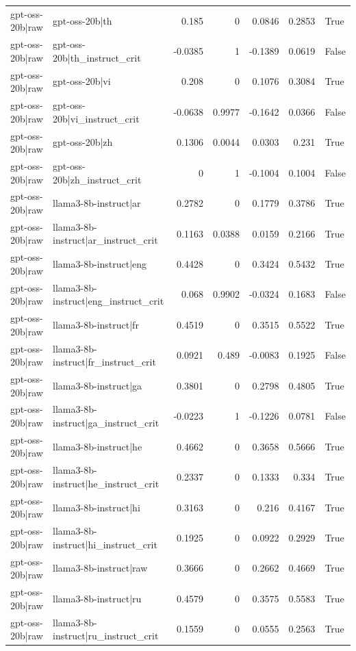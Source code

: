 \begin{table}
\begin{tabular}{l l r r r r l}
gpt-oss-20b|raw & gpt-oss-20b|th & 0.185 & 0 & 0.0846 & 0.2853 & True \\
gpt-oss-20b|raw & gpt-oss-20b|th_instruct_crit & -0.0385 & 1 & -0.1389 & 0.0619 & False \\
gpt-oss-20b|raw & gpt-oss-20b|vi & 0.208 & 0 & 0.1076 & 0.3084 & True \\
gpt-oss-20b|raw & gpt-oss-20b|vi_instruct_crit & -0.0638 & 0.9977 & -0.1642 & 0.0366 & False \\
gpt-oss-20b|raw & gpt-oss-20b|zh & 0.1306 & 0.0044 & 0.0303 & 0.231 & True \\
gpt-oss-20b|raw & gpt-oss-20b|zh_instruct_crit & 0 & 1 & -0.1004 & 0.1004 & False \\
gpt-oss-20b|raw & llama3-8b-instruct|ar & 0.2782 & 0 & 0.1779 & 0.3786 & True \\
gpt-oss-20b|raw & llama3-8b-instruct|ar_instruct_crit & 0.1163 & 0.0388 & 0.0159 & 0.2166 & True \\
gpt-oss-20b|raw & llama3-8b-instruct|eng & 0.4428 & 0 & 0.3424 & 0.5432 & True \\
gpt-oss-20b|raw & llama3-8b-instruct|eng_instruct_crit & 0.068 & 0.9902 & -0.0324 & 0.1683 & False \\
gpt-oss-20b|raw & llama3-8b-instruct|fr & 0.4519 & 0 & 0.3515 & 0.5522 & True \\
gpt-oss-20b|raw & llama3-8b-instruct|fr_instruct_crit & 0.0921 & 0.489 & -0.0083 & 0.1925 & False \\
gpt-oss-20b|raw & llama3-8b-instruct|ga & 0.3801 & 0 & 0.2798 & 0.4805 & True \\
gpt-oss-20b|raw & llama3-8b-instruct|ga_instruct_crit & -0.0223 & 1 & -0.1226 & 0.0781 & False \\
gpt-oss-20b|raw & llama3-8b-instruct|he & 0.4662 & 0 & 0.3658 & 0.5666 & True \\
gpt-oss-20b|raw & llama3-8b-instruct|he_instruct_crit & 0.2337 & 0 & 0.1333 & 0.334 & True \\
gpt-oss-20b|raw & llama3-8b-instruct|hi & 0.3163 & 0 & 0.216 & 0.4167 & True \\
gpt-oss-20b|raw & llama3-8b-instruct|hi_instruct_crit & 0.1925 & 0 & 0.0922 & 0.2929 & True \\
gpt-oss-20b|raw & llama3-8b-instruct|raw & 0.3666 & 0 & 0.2662 & 0.4669 & True \\
gpt-oss-20b|raw & llama3-8b-instruct|ru & 0.4579 & 0 & 0.3575 & 0.5583 & True \\
gpt-oss-20b|raw & llama3-8b-instruct|ru_instruct_crit & 0.1559 & 0 & 0.0555 & 0.2563 & True \\

\end{tabular}
\end{table}
